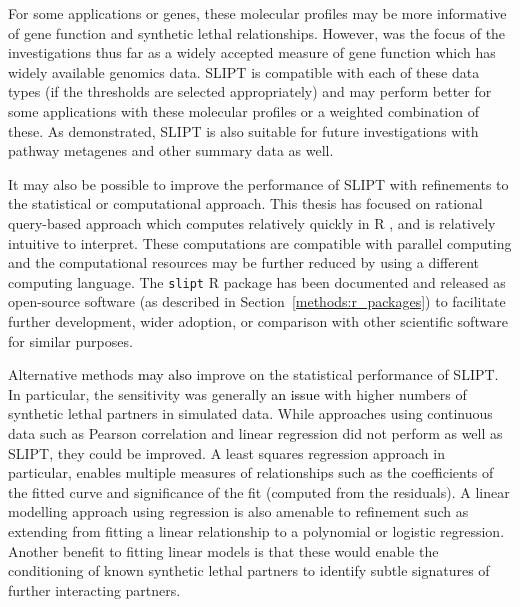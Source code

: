 For some applications or genes, these molecular profiles may be more informative of gene function and \gls{synthetic lethal} relationships. However,  was the focus of the investigations thus far as a widely accepted measure of gene function which has widely available \glspl{genomic} data.  \gls{SLIPT} is compatible with each of these data types (if the thresholds are selected appropriately) and may perform better for some applications with these molecular profiles or a weighted combination of these. As demonstrated, \gls{SLIPT} is also suitable for future investigations with pathway \glspl{metagene} and other summary data as well.

It may also be possible to improve the performance of \gls{SLIPT} with refinements to the statistical or computational approach. This thesis has focused on rational query-based approach which computes relatively quickly in R \citep{R_core}, and is relatively intuitive to interpret. These computations are compatible with parallel computing and the computational resources may be further reduced by using a different computing language. The \texttt{slipt} R package has been documented and released as open-source software (as described in Section~\ref{methods:r_packages}) to facilitate further development, wider adoption, or comparison with other scientific software for similar purposes. 

Alternative methods \textcolor{black}{may also} improve on the statistical performance of \gls{SLIPT}. In particular, the sensitivity was generally \textcolor{black}{an issue} with higher numbers of \gls{synthetic lethal} partners in simulated data. While approaches using continuous data such as Pearson correlation and linear regression did not perform as well as \gls{SLIPT}, they could be improved. A least squares regression approach in particular, enables multiple measures of relationships such as the coefficients of the fitted curve and significance of the fit (computed from the residuals). A linear modelling approach using regression is also amenable to refinement such as extending from fitting a linear relationship to a polynomial or logistic regression. Another benefit to fitting linear models is that these would enable the conditioning of known \gls{synthetic lethal} partners to identify subtle signatures of further interacting partners.

